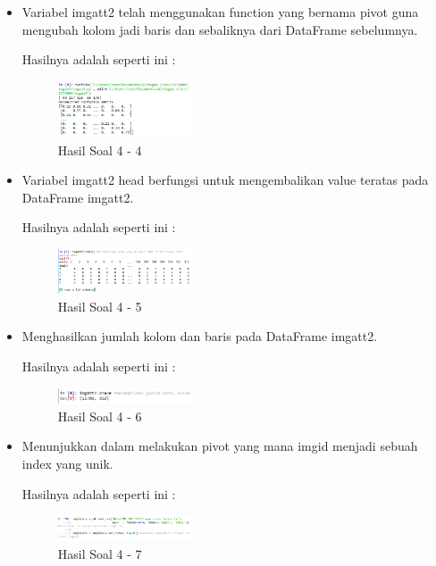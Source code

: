 \begin{enumerate}
\begin{itemize}
	\item Variabel imgatt2 telah menggunakan function yang bernama pivot guna mengubah kolom jadi baris dan sebaliknya dari DataFrame sebelumnya.
	
	Hasilnya adalah seperti ini :

	\begin{figure}[H]
	\centering
		\includegraphics[width=4cm]{figures/1174009/tugas3/materi/4.PNG}
		\caption{Hasil Soal 4 - 4}
	\end{figure}

	\item Variabel imgatt2 head berfungsi untuk mengembalikan value teratas pada DataFrame imgatt2.
	
	Hasilnya adalah seperti ini :

	\begin{figure}[H]
	\centering
		\includegraphics[width=4cm]{figures/1174009/tugas3/materi/5.PNG}
		\caption{Hasil Soal 4 - 5}
	\end{figure}

	\item Menghasilkan jumlah kolom dan baris pada DataFrame imgatt2.
	
	Hasilnya adalah seperti ini :

	\begin{figure}[H]
	\centering
		\includegraphics[width=4cm]{figures/1174009/tugas3/materi/6.PNG}
		\caption{Hasil Soal 4 - 6}
	\end{figure}

	\item Menunjukkan dalam melakukan pivot yang mana imgid menjadi sebuah index yang unik.
	
	Hasilnya adalah seperti ini :

	\begin{figure}[H]
	\centering
		\includegraphics[width=4cm]{figures/1174009/tugas3/materi/7.PNG}
		\caption{Hasil Soal 4 - 7}
	\end{figure}


\end{itemize}
\end{enumerate}
